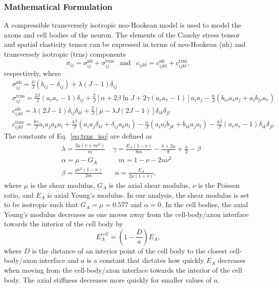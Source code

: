 \documentclass[10pt]{asme2ej}
\begin{document}
\subsubsection{Mathematical Formulation}
A compressible transversely isotropic neo-Hookean model is used to model \cite{Bonet:1998vc} the axons and cell bodies of the neuron. The elements of the Cauchy stress tensor and spatial elasticity tensor can be expressed in terms of neo-Hookean (nh) and transversely isotropic (trns) components \cite{Bonet:1998vc}
%
\begin{equation}
\sigma_{ij} = \sigma^{\text{nh}}_{ij} + \sigma^{\text{trns}}_{ij} \ \ \text{ and } \ \ c_{ijkl} = c^{\text{nh}}_{ijkl} + c^{\text{trns}}_{ijkl},
\end{equation}
%
respectively, where 
%
\begin{align}
&\sigma^{\text{nh}}_{ij} = \frac{\mu}{J}(b_{ij} - \delta_{ij}) + \lambda(J-1)\delta_{ij} \nonumber\\
%
&\sigma^{\text{trns}}_{ij} = \frac{2\beta}{J}(a_r a_r - 1)\delta_{ij} + \frac{2}{J}[\alpha+2\beta\ln J+2\gamma(a_r a_r -1)]a_i a_j - \frac{\alpha}{J}(b_{is}a_s a_j+a_i b_{jr}a_r) \nonumber\\
%
&c^{\text{nh}}_{ijkl} = \lambda(2J-1)\delta_{ij}\delta_{kl} + \frac{2}{J}[\mu - \lambda J(2J-1)]\delta_{ik}\delta_{jl} \nonumber\\
%
&c^{\text{trns}}_{ijkl} = \frac{8\gamma}{J}a_i a_j a_k a_l + \frac{4\beta}{J}(a_i a_j \delta_{kl} + \delta_{ij}a_k a_l) - \frac{\alpha}{J}(a_i a_l b_{jk} + b_{ik}a_j a_l) - \frac{4\beta}{J}(a_r a_r - 1)\delta_{ik}\delta_{jl}.
\label{eq:trns_iso}
\end{align}
%
The constants of Eq.\ \eqref{eq:trns_iso} are defined as
%
\begin{align}
&\lambda = \frac{2\mu (\nu+n\nu^2)}{m} \ \ \ \ \ \gamma = \frac{E_A(1-\nu)}{8m} - \frac{\lambda+2\mu}{8} + \frac{\alpha}{2} - \beta \nonumber\\
%
&\alpha = \mu - G_A \ \ \ \ \ \ \ \ \ \ \ \ \ \ m = 1 - \nu - 2 n\nu^2 \nonumber\\
%
&\beta = \frac{\mu \nu^2(1-n)}{2m} \ \ \ \ \ \ \ \ n = \frac{E_A}{2\mu(1+\nu)},
\label{eq:trns_iso_constants}
\end{align}
%
where $\mu$ is the shear modulus, $G_A$ is the axial shear modulus, $\nu$ is the Poisson ratio, and $E_A$ is axial Young's modulus. In our analysis, the shear modulus is set to be isotropic such that $G_A=\mu=0.577$ and $\alpha = 0$. In the cell bodies, the axial Young's modulus decreases as one moves away from the cell-body/axon interface towards the interior of the cell body by 
%
\begin{equation}
E_A^{cell} = \left(1 - \frac{D}{a}\right)E_A,
\label{eq:cellEA}
\end{equation}
%
where $D$ is the distance of an interior point of the cell body to the closest cell-body/axon interface and $a$ is a constant that dictates how quickly $E_A$ decreases when moving from the cell-body/axon interface towards the interior of the cell body. The axial stiffness decreases more quickly for smaller values of $a$. 
\end{document}
